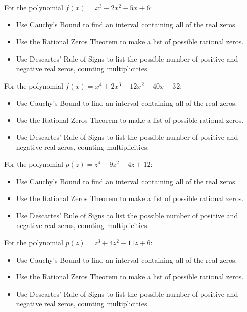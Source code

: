 \documentclass{ximera}
\begin{document}
	\author{Stitz-Zeager}

\begin{problem}\label{prelimpolystufffirst}
For the polynomial $f(x) = x^{3} - 2x^{2} - 5x + 6$:

\begin{itemize}
\item  Use Cauchy's Bound to find an interval containing all of the real zeros.
\item  Use the Rational Zeros Theorem to make a list of possible rational zeros.
\item  Use Descartes' Rule of Signs to list the possible number of positive and negative real zeros, counting multiplicities.
\end{itemize}
\end{problem}

\begin{problem}
For the polynomial $f(x) = x^{4} + 2x^{3} - 12x^{2} - 40x - 32$:

\begin{itemize}
\item  Use Cauchy's Bound to find an interval containing all of the real zeros.
\item  Use the Rational Zeros Theorem to make a list of possible rational zeros.
\item  Use Descartes' Rule of Signs to list the possible number of positive and negative real zeros, counting multiplicities.
\end{itemize}
\end{problem}

\begin{problem}
For the polynomial $p(z) = z^{4} - 9z^{2} - 4z + 12$:

\begin{itemize}
\item  Use Cauchy's Bound to find an interval containing all of the real zeros.
\item  Use the Rational Zeros Theorem to make a list of possible rational zeros.
\item  Use Descartes' Rule of Signs to list the possible number of positive and negative real zeros, counting multiplicities.
\end{itemize}
\end{problem}

\begin{problem}
For the polynomial $p(z) = z^{3} + 4z^{2} - 11z + 6$:

\begin{itemize}
\item  Use Cauchy's Bound to find an interval containing all of the real zeros.
\item  Use the Rational Zeros Theorem to make a list of possible rational zeros.
\item  Use Descartes' Rule of Signs to list the possible number of positive and negative real zeros, counting multiplicities.
\end{itemize}
\end{problem}
\end{document}
